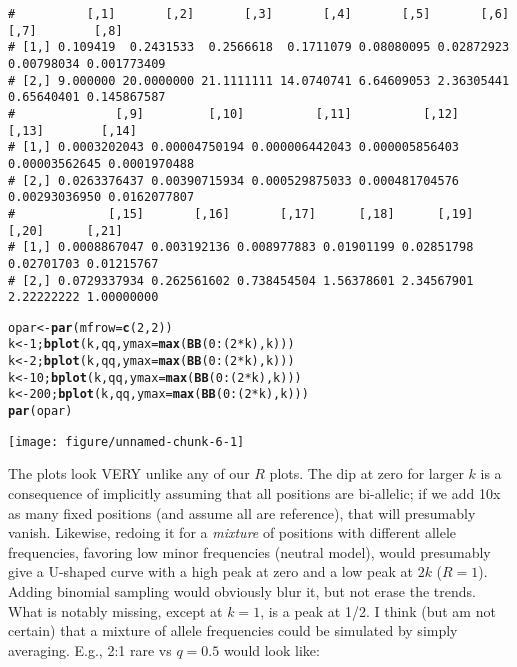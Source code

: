 \documentclass{article}\usepackage[]{graphicx}\usepackage[]{color}
\makeatletter
\def\maxwidth{ %
  \ifdim\Gin@nat@width>\linewidth
    \linewidth
  \else
    \Gin@nat@width
  \fi
}
\newcommand{\hlnum}[1]{\textcolor[rgb]{0.686,0.059,0.569}{#1}}%
\newcommand{\hlopt}[1]{\textcolor[rgb]{0,0,0}{#1}}%
\newcommand{\hlstd}[1]{\textcolor[rgb]{0.345,0.345,0.345}{#1}}%
\newcommand{\hlkwb}[1]{\textcolor[rgb]{0.69,0.353,0.396}{#1}}%
\newcommand{\hlkwc}[1]{\textcolor[rgb]{0.333,0.667,0.333}{#1}}%
\newcommand{\hlkwd}[1]{\textcolor[rgb]{0.737,0.353,0.396}{\textbf{#1}}}%
\newenvironment{kframe}{%
 \def\at@end@of@kframe{}%
 \ifinner\ifhmode%
  \def\at@end@of@kframe{\end{minipage}}%
  \begin{minipage}{\columnwidth}%
 \fi\fi%
 \def\FrameCommand##1{\hskip\@totalleftmargin \hskip-\fboxsep
 \colorbox{shadecolor}{##1}\hskip-\fboxsep
     \hskip-\linewidth \hskip-\@totalleftmargin \hskip\columnwidth}%
 \MakeFramed {\advance\hsize-\width
   \@totalleftmargin\z@ \linewidth\hsize
   \@setminipage}}%
 {\par\unskip\endMakeFramed%
 \at@end@of@kframe}
\newenvironment{knitrout}{}{} %
\makeatother
\begin{document}
\begin{knitrout}
\begin{kframe}
\begin{alltt}
\end{alltt}
\begin{verbatim}
#          [,1]       [,2]       [,3]       [,4]       [,5]       [,6]       [,7]        [,8]
# [1,] 0.109419  0.2431533  0.2566618  0.1711079 0.08080095 0.02872923 0.00798034 0.001773409
# [2,] 9.000000 20.0000000 21.1111111 14.0740741 6.64609053 2.36305441 0.65640401 0.145867587
#              [,9]         [,10]          [,11]          [,12]         [,13]        [,14]
# [1,] 0.0003202043 0.00004750194 0.000006442043 0.000005856403 0.00003562645 0.0001970488
# [2,] 0.0263376437 0.00390715934 0.000529875033 0.000481704576 0.00293036950 0.0162077807
#             [,15]       [,16]       [,17]      [,18]      [,19]      [,20]      [,21]
# [1,] 0.0008867047 0.003192136 0.008977883 0.01901199 0.02851798 0.02701703 0.01215767
# [2,] 0.0729337934 0.262561602 0.738454504 1.56378601 2.34567901 2.22222222 1.00000000
\end{verbatim}
\begin{alltt}
\hlstd{opar} \hlkwb{<-} \hlkwd{par}\hlstd{(}\hlkwc{mfrow}\hlstd{=}\hlkwd{c}\hlstd{(}\hlnum{2}\hlstd{,}\hlnum{2}\hlstd{))}
\hlstd{k} \hlkwb{<-} \hlnum{1}\hlstd{;} \hlkwd{bplot}\hlstd{(k, qq,} \hlkwc{ymax}\hlstd{=}\hlkwd{max}\hlstd{(}\hlkwd{BB}\hlstd{(}\hlnum{0}\hlopt{:}\hlstd{(}\hlnum{2}\hlopt{*}\hlstd{k), k)))}
\hlstd{k} \hlkwb{<-} \hlnum{2}\hlstd{;} \hlkwd{bplot}\hlstd{(k, qq,} \hlkwc{ymax}\hlstd{=}\hlkwd{max}\hlstd{(}\hlkwd{BB}\hlstd{(}\hlnum{0}\hlopt{:}\hlstd{(}\hlnum{2}\hlopt{*}\hlstd{k), k)))}
\hlstd{k} \hlkwb{<-}\hlnum{10}\hlstd{;} \hlkwd{bplot}\hlstd{(k, qq,} \hlkwc{ymax}\hlstd{=}\hlkwd{max}\hlstd{(}\hlkwd{BB}\hlstd{(}\hlnum{0}\hlopt{:}\hlstd{(}\hlnum{2}\hlopt{*}\hlstd{k), k)))}
\hlstd{k}\hlkwb{<-}\hlnum{200}\hlstd{;} \hlkwd{bplot}\hlstd{(k, qq,} \hlkwc{ymax}\hlstd{=}\hlkwd{max}\hlstd{(}\hlkwd{BB}\hlstd{(}\hlnum{0}\hlopt{:}\hlstd{(}\hlnum{2}\hlopt{*}\hlstd{k), k)))}
\hlkwd{par}\hlstd{(opar)}
\end{alltt}
\end{kframe}
\texttt{[image: figure/unnamed-chunk-6-1]} 

\end{knitrout}

The plots look VERY unlike any of our $R$ plots.  The dip at zero for larger $k$ is a consequence of implicitly assuming that all positions are bi-allelic; if we add 10x as many fixed positions (and assume all are reference), that will presumably vanish.  Likewise, redoing it for a \emph{mixture} of positions with different allele frequencies, favoring low minor frequencies (neutral model), would presumably give a U-shaped curve with a high peak at zero and a low peak at $2k$ ($R=1$). Adding binomial sampling would obviously blur it, but not erase the trends.  What is notably missing, except at $k=1$, is a peak at 1/2.  I think (but am not certain) that a mixture of allele frequencies could be simulated by simply averaging.  E.g., 2:1 rare vs $q=0.5$ would look like:
\end{document}
